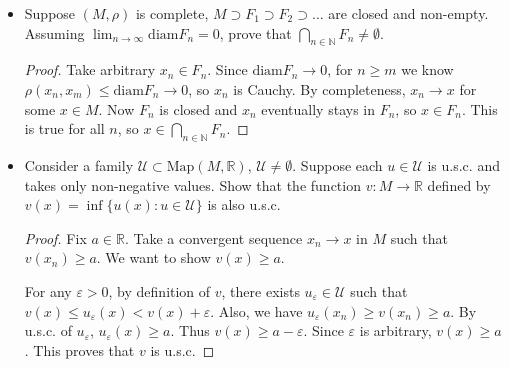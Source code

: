 \begin{itemize}
\begin{proof}
	Now since $A$ is compact, $F \cap A$ is closed. This shows $x \in F \cap A$, whence $x \in F$. Hence $F$ closed.
\end{proof}

\item Suppose $(M, \rho)$ is complete, $M \supset F_1 \supset F_2 \supset \ldots$ are closed and non-empty. Assuming $\lim_{n \to \infty} \text{diam} F_n = 0$, prove that $\bigcap_{n \in \mathbb{N}} F_n \neq \emptyset $.
\begin{proof}
	Take arbitrary $x_n \in F_n$. Since $\text{diam}F_n \to 0$, for $n \ge m$ we know $\rho(x_n, x_m) \le \text{diam} F_n \to 0$, so $x_n$ is Cauchy. By completeness, $x_n \to x$ for some $x \in M$. Now $F_n$ is closed and $x_n$ eventually stays in $F_n$, so $x \in F_n$. This is true for all $n$, so $x \in \bigcap_{n \in \mathbb{N}} F_n$.
\end{proof}

\item Consider a family $\mathcal{U} \subset \text{Map}(M, \mathbb{R})$, $\mathcal{U} \neq \emptyset $. Suppose each $u \in \mathcal{U}$ is u.s.c. and takes only non-negative values. Show that the function $v: M \to  \mathbb{R}$ defined by $v(x) = \operatorname{inf} \{u(x): u \in \mathcal{U}\} $ is also u.s.c.
\begin{proof}
	Fix $a \in \mathbb{R}$. Take a convergent sequence $x_n \to x$ in $M$ such that $v(x_n) \ge a$. We want to show $v(x) \ge a$. 

	For any $\varepsilon>0$, by definition of $v$, there exists $u_\varepsilon \in \mathcal{U}$ such that $v(x) \le  u_\varepsilon(x) < v(x) + \varepsilon$. Also, we have $u_\varepsilon(x_n) \ge v(x_n) \ge a$. By u.s.c. of $u_\varepsilon$, $u_\varepsilon(x) \ge a$. Thus $v(x) \ge  a - \varepsilon$. Since $\varepsilon$ is arbitrary, $v(x) \ge a$. This proves that $v$ is u.s.c.
\end{proof}




\end{itemize}
